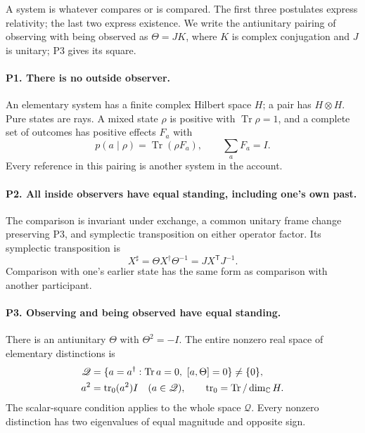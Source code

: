 \documentclass[aps,prx,reprint,longbibliography]{revtex4-2}
\providecommand{\Tr}{\operatorname{Tr}}
\providecommand{\trn}{\operatorname{tr}_0}
\providecommand{\C}{\mathbb C}
\begin{document}
A system is whatever compares or is compared. The first three postulates express relativity; the last two express existence. We write the antiunitary pairing of observing with being observed as $\Theta=JK$, where $K$ is complex conjugation and $J$ is unitary; P3 gives its square.

\paragraph*{P1. There is no outside observer.}
An elementary system has a finite complex Hilbert space $H$; a pair has $H\otimes H$. Pure states are rays. A mixed state $\rho$ is positive with $\Tr\rho=1$, and a complete set of outcomes has positive effects $F_a$ with
\begin{equation}
 p(a\mid\rho)=\Tr(\rho F_a),\qquad \sum_aF_a=I.
 \label{eq:probability}
\end{equation}
Every reference in this pairing is another system in the account.

\paragraph*{P2. All inside observers have equal standing, including one's own past.}
The comparison is invariant under exchange, a common unitary frame change preserving P3, and symplectic transposition on either operator factor. Its symplectic transposition is
\begin{equation}
 X^\sharp=\Theta X^\dagger\Theta^{-1}=JX^{\mathsf T}J^{-1}.
 \label{eq:sharp}
\end{equation}
Comparison with one's earlier state has the same form as comparison with another participant.

\paragraph*{P3. Observing and being observed have equal standing.}
There is an antiunitary $\Theta$ with $\Theta^2=-I$. The entire nonzero real space of elementary distinctions is
\begin{align}
 \mathscr Q&=\{a=a^\dagger:\Tr a=0,\ [a,\Theta]=0\}\ne\{0\},\notag\\
 a^2&=\trn(a^2)I\quad(a\in \mathscr Q),\qquad
 \trn=\Tr/\dim_\C H.
 \label{eq:postulate-square}
\end{align}
The scalar-square condition applies to the whole space $\mathscr Q$. Every nonzero distinction has two eigenvalues of equal magnitude and opposite sign.
\end{document}
